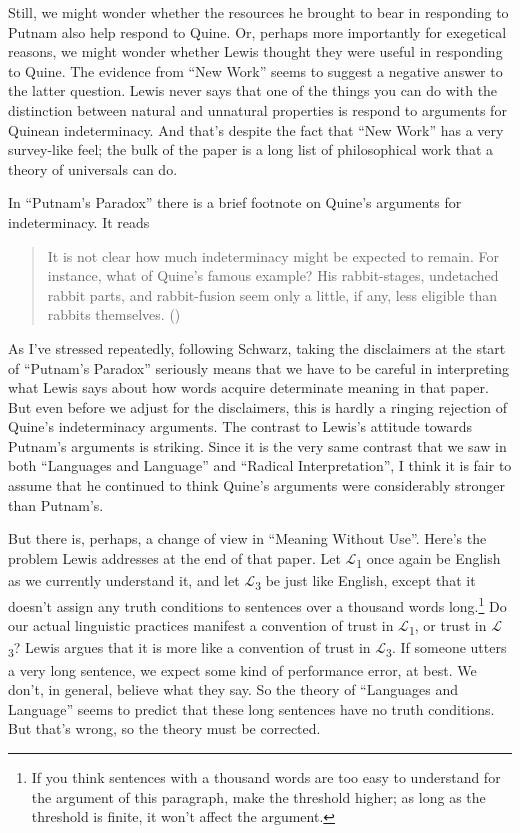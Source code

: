 \documentclass[
  10pt,
  letterpaper,
  DIV=11,
  numbers=noendperiod,
  twoside]{scrartcl}
\begin{document}
Still, we might wonder whether the resources he brought to bear in
responding to Putnam also help respond to Quine. Or, perhaps more
importantly for exegetical reasons, we might wonder whether Lewis
thought they were useful in responding to Quine. The evidence from ``New
Work'' seems to suggest a negative answer to the latter question. Lewis
never says that one of the things you can do with the distinction
between natural and unnatural properties is respond to arguments for
Quinean indeterminacy. And that's despite the fact that ``New Work'' has
a very survey-like feel; the bulk of the paper is a long list of
philosophical work that a theory of universals can do.

In ``Putnam's Paradox'' there is a brief footnote on Quine's arguments
for indeterminacy. It reads

\begin{quote}
It is not clear how much indeterminacy might be expected to remain. For
instance, what of Quine's famous example? His rabbit-stages, undetached
rabbit parts, and rabbit-fusion seem only a little, if any, less
eligible than rabbits themselves. ()
\end{quote}

As I've stressed repeatedly, following Schwarz, taking the disclaimers
at the start of ``Putnam's Paradox'' seriously means that we have to be
careful in interpreting what Lewis says about how words acquire
determinate meaning in that paper. But even before we adjust for the
disclaimers, this is hardly a ringing rejection of Quine's indeterminacy
arguments. The contrast to Lewis's attitude towards Putnam's arguments
is striking. Since it is the very same contrast that we saw in both
``Languages and Language'' and ``Radical Interpretation'', I think it is
fair to assume that he continued to think Quine's arguments were
considerably stronger than Putnam's.

But there is, perhaps, a change of view in ``Meaning Without Use''.
Here's the problem Lewis addresses at the end of that paper. Let
\(\mathcal{L}\)\textsubscript{1} once again be English as we currently
understand it, and let \(\mathcal{L}\)\textsubscript{3} be just like
English, except that it doesn't assign any truth conditions to sentences
over a thousand words long.\footnote{If you think sentences with a
  thousand words are too easy to understand for the argument of this
  paragraph, make the threshold higher; as long as the threshold is
  finite, it won't affect the argument.} Do our actual linguistic
practices manifest a convention of trust in
\(\mathcal{L}\)\textsubscript{1}, or trust in
\(\mathcal{L}\)\textsubscript{3}? Lewis argues that it is more like a
convention of trust in \(\mathcal{L}\)\textsubscript{3}. If someone
utters a very long sentence, we expect some kind of performance error,
at best. We don't, in general, believe what they say. So the theory of
``Languages and Language'' seems to predict that these long sentences
have no truth conditions. But that's wrong, so the theory must be
corrected.
\end{document}
